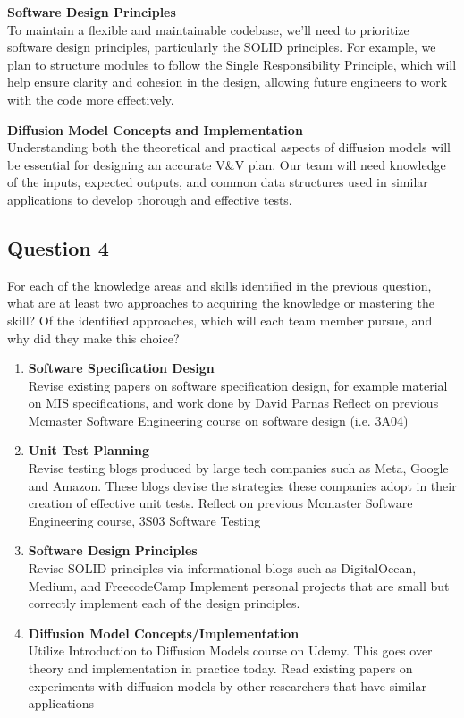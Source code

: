 \documentclass[12pt, titlepage]{article}
\begin{document}
\textbf{Software Design Principles}\\
To maintain a flexible and maintainable codebase, we'll need to prioritize software design principles, particularly the SOLID principles. For example, we plan to structure modules to follow the Single Responsibility Principle, which will help ensure clarity and cohesion in the design, allowing future engineers to work with the code more effectively.

\textbf{Diffusion Model Concepts and Implementation}\\
Understanding both the theoretical and practical aspects of diffusion models will be essential for designing an accurate V\&V plan. Our team will need knowledge of the inputs, expected outputs, and common data structures used in similar applications to develop thorough and effective tests.

\subsection{Question 4}
For each of the knowledge areas and skills identified in the previous
question, what are at least two approaches to acquiring the knowledge or
mastering the skill?  Of the identified approaches, which will each team
member pursue, and why did they make this choice?\\

\begin{enumerate}
  \item \textbf{Software Specification Design}\\
    Revise existing papers on software specification design, for example material on MIS specifications, and work done by David Parnas
    Reflect on previous Mcmaster Software Engineering course on software design (i.e. 3A04)

  \item \textbf{Unit Test Planning}\\
    Revise testing blogs produced by large tech companies such as Meta, Google and Amazon. These blogs devise the strategies these companies adopt in their creation of effective unit tests.
    Reflect on previous Mcmaster Software Engineering course, 3S03 Software Testing

  \item \textbf{Software Design Principles}\\
    Revise SOLID principles via informational blogs such as DigitalOcean, Medium, and FreecodeCamp
    Implement personal projects that are small but correctly implement each of the design principles.

  \item \textbf{Diffusion Model Concepts/Implementation}\\
    Utilize Introduction to Diffusion Models course on Udemy. This goes over theory and implementation in practice today.
    Read existing papers on experiments with diffusion models by other researchers that have similar applications
\end{enumerate}
\end{document}
